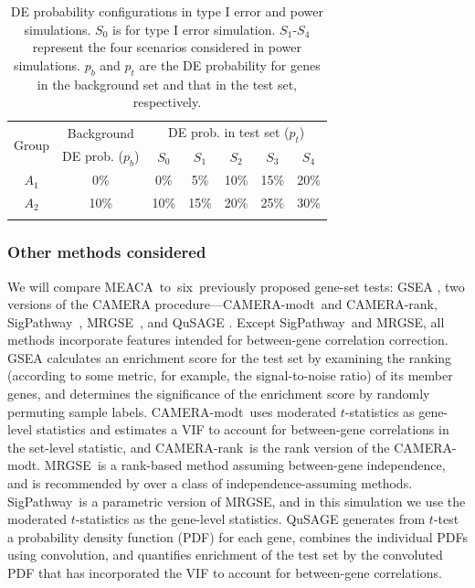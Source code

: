 \documentclass[a4,center,fleqn]{NAR}
\newcommand{\OurMethod}{MEACA}
\newcommand{\HowmanyTest}{six}
\newcommand{\CMR}{CAMERA-rank}
\newcommand{\CMT}{CAMERA-modt}
\newcommand{\gent}{SigPathway}
\newcommand{\genr}{MRGSE}
\begin{document}
	
	\begin{table}[!ht]
		\centering
		\caption[DE probability configurations in type I error and power simulations]{DE 
			probability configurations in type I error and power simulations. $S_0$ is for
			type I error simulation. $S_1$-$S_4$ represent the four scenarios considered in power 
			simulations. $p_b$ and $p_t$ are the DE probability for genes in the background set and 
			that in the test set, respectively.}		
		\begin{tabular}{ccccccc}
			\toprule
			\multirow{2}{*}{Group} & 	Background & \multicolumn{5}{c}{DE prob. in test set 
				($p_t$)}\\  \cline{3-7}
			&DE prob. ($p_b$)&$S_0$ &$S_1$ &$S_2$ &$S_3$ &$S_4$\\
			\colrule
			$A_1$ & 0\% & 0\%  & 5\% & 10\% & 15\% & 20\%\\ 
			$A_2$ & 10\% & 10\% & 15\%& 20\%& 25\% & 30\%\\  
			\botrule
		\end{tabular}	
		\label{table:simusetup}
	\end{table}
	
	
	\subsubsection{Other methods considered}
	
	We will compare \OurMethod~to~\HowmanyTest~previously proposed gene-set tests: GSEA
	\citep{subramanian2005gene}, two versions of the CAMERA \citep{wu2012camera} 
	procedure---\CMT~and
	\CMR, \gent~\citep{tian2005discovering}, 
	\genr~\citep{michaud2008integrative}, and QuSAGE \citep{yaari2013quantitative}. Except 
	\gent~and \genr, all methods incorporate features intended for between-gene correlation 
	correction. GSEA calculates an enrichment score for the test set by examining the ranking 
	(according to some metric, for example, the signal-to-noise ratio) of its member genes, and 
	determines the significance of the enrichment
	score by randomly permuting sample labels. \CMT~uses moderated $t$-statistics 
	\citep{Smyth2004moderated} as gene-level statistics and estimates a VIF to account for 
	between-gene correlations in the set-level statistic, and \CMR~is the rank version of the \CMT.
	\genr~is a rank-based method assuming between-gene independence, and is recommended by 
	\citet{tarca2013comparison} over a class of independence-assuming methods. \gent~is a 
	parametric version of \genr, and in this simulation we use the moderated $t$-statistics as the 
	gene-level statistics. 
	QuSAGE generates from $t$-test a probability density function (PDF) for each gene, combines the 
	individual PDFs using convolution, and quantifies enrichment of the test set by the convoluted 
	PDF that has incorporated the VIF to account for between-gene correlations. 
	
\end{document}
